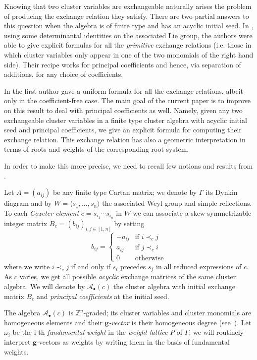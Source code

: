 \documentclass[11pt]{amsart}
\newcommand{\cA}{\mathcal{A}}
\newcommand{\ZZ}{\mathbb{Z}}
\newcommand{\bg}{\mathbf{g}}
\theoremstyle{definition}
\numberwithin{equation}{section}
\numberwithin{figure}{section}
\begin{document}
  Knowing that two cluster variables are exchangeable naturally arises the problem of producing the exchange relation they satisfy.
  There are two partial answers to this question when the algebra is of finite type and has an acyclic initial seed. 
  In \cite{YZ08}, using some determinantal identities on the associated Lie group, the authors were able to give explicit formulas for all the \emph{primitive} exchange relations (i.e. those in which cluster variables only appear in one of the two monomials of the right hand side). 
  Their recipe works for principal coefficients and hence, via separation of additions, for any choice of coefficients.

  In \cite{Ste13} the first author gave a uniform formula for all the exchange relations, albeit only in the coefficient-free case.
  The main goal of the current paper is to improve on this result to deal with principal coefficients as well. 
  Namely, given any two exchangeable cluster variables in a finite type cluster algebra with acyclic initial seed and principal coefficients, we give an explicit formula for computing their exchange relation.
  This exchange relation has also a geometric interpretation in terms of roots and weights of the corresponding root system.

 
  In order to make this more precise, we need to recall few notions and results from \cite{Ste13,YZ08}.

  Let $A=(a_{ij})$ be any finite type Cartan matrix; we denote by $\Gamma$ its Dynkin diagram and by $W=\langle s_1,\dots,s_n\rangle$ the associated Weyl group and simple reflections.
  To each \emph{Coxeter element} $c=s_{i_1}\cdots s_{i_n}$ in $W$ we can associate a skew-symmetrizable integer matrix $B_c=(b_{ij})_{i,j\in[1,n]}$ by setting
  \[
    b_{ij}=
    \begin{cases}
      -a_{ij} & \text{if } i\prec_c j  \\
      a_{ij}  & \text{if } j\prec_c i  \\
      0       & \text{otherwise}
    \end{cases}
  \]
  where we write $i\prec_c j$ if and only if $s_i$ precedes $s_j$ in all reduced expressions of $c$.
  As $c$ varies, we get all possible \emph{acyclic} exchange matrices of the same cluster algebra.
  We will denote by $\cA_\bullet(c)$ the cluster algebra with initial exchange matrix $B_c$ and  \emph{principal coefficients} at the initial seed.

  The algebra $\cA_\bullet(c)$ is $\ZZ^n$-graded; its cluster variables and cluster monomials are homogeneous elements and their \emph{$\bg$-vector} is their homogeneous degree (see~\cite[Section~6]{FZ07}).
  Let $\omega_i$ be the i-th \emph{fundamental weight} in the \emph{weight lattice} $P$ of $\Gamma$; we will routinely interpret $\bg$-vectors as weights by writing them in the basis of fundamental weights.
\end{document}
